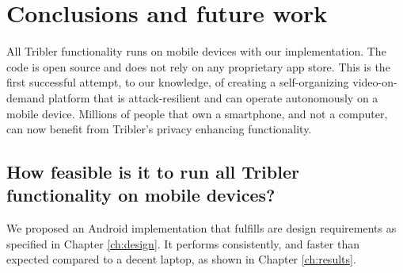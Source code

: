 \chapter{Conclusions and future work}\label{ch:conclusions}

All Tribler functionality runs on mobile devices with our implementation.
The code is open source \cite{github_tribler_repo} and does not rely on any proprietary app store.
This is the first successful attempt, to our knowledge, of creating a self-organizing video-on-demand platform that is attack-resilient and can operate autonomously on a mobile device.
Millions of people that own a smartphone, and not a computer, can now benefit from Tribler's privacy enhancing functionality.


\section{How feasible is it to run all Tribler functionality on mobile devices?} %
We proposed an Android implementation that fulfills are design requirements as specified in Chapter \ref{ch:design}.
It performs consistently, and faster than expected compared to a decent laptop, as shown in Chapter \ref{ch:results}.

